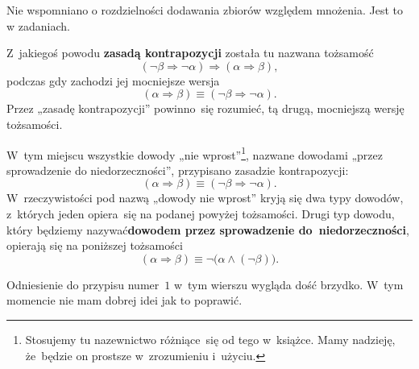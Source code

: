 \documentclass[a4paper,11pt]{article}
\numberwithin{equation}{section}
\begin{document}
\vspace{0em}



Nie wspomniano o rozdzielności dodawania zbiorów względem mnożenia. Jest to
w zadaniach.

\noindent
{} Z~jakiegoś powodu \textbf{zasadą kontrapozycji} została tu nazwana
tożsamość
\begin{equation}
  \label{eq:Kuratowski-Wstep-do-teorii-mnogosci-ETC-01}
  ( \neg \beta \Rightarrow \neg \alpha ) \Rightarrow ( \alpha \Rightarrow \beta ),
\end{equation}
podczas gdy zachodzi jej mocniejsze wersja
\begin{equation}
  \label{eq:Kuratowski-Wstep-do-teorii-mnogosci-ETC-02}
  ( \alpha \Rightarrow \beta ) \equiv ( \neg \beta \Rightarrow \neg \alpha ).
\end{equation}
Przez „zasadę kontrapozycji” powinno~się rozumieć, tą drugą, mocniejszą
wersję tożsamości.

\VerSpaceFour





\noindent
{} W~tym miejscu wszystkie dowody
„nie wprost”\footnote{Stosujemy tu nazewnictwo różniące~się od tego
  w~książce. Mamy nadzieję, że~będzie on prostsze w~zrozumieniu i~użyciu.},
nazwane dowodami „przez sprowadzenie do niedorzeczności”, przypisano
zasadzie kontrapozycji:
\begin{equation}
  \label{eq:Kuratowski-Wstep-do-teorii-mnogosci-ETC-03}
  ( \alpha \Rightarrow \beta ) \equiv ( \neg \beta \Rightarrow \neg \alpha).
\end{equation}
W~rzeczywistości pod nazwą „dowody nie wprost” kryją się dwa typy dowodów,
z~których jeden opiera~się na podanej powyżej tożsamości. Drugi typ dowodu,
który będziemy nazywać\textbf{dowodem przez sprowadzenie
  do~niedorzeczności}, opierają się na poniższej tożsamości
\begin{equation}
  \label{eq:Kuratowski-Wstep-do-teorii-mnogosci-ETC-04}
  ( \alpha \Rightarrow \beta ) \equiv \neg \big( \alpha \land ( \neg \beta ) \big).
\end{equation}

\VerSpaceFour





\noindent
{} Odniesienie do przypisu numer~$1$ w~tym wierszu wygląda dość
brzydko. W~tym momencie nie mam dobrej idei jak to poprawić.
\end{document}

